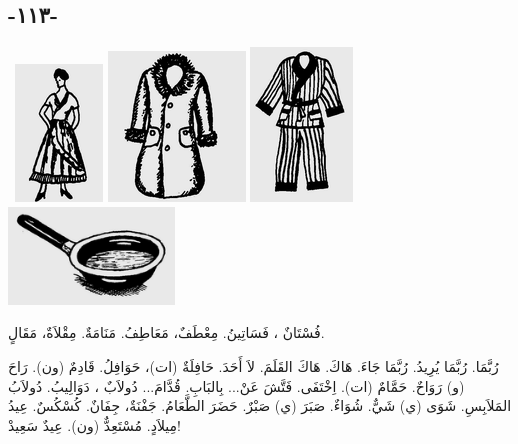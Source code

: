 \documentclass[a5paper]{article}
\begin{document}
\subsection{-١١٣-}
\  \includegraphics[width=0.9165in,height=1.4374in]{MuhammadBagauddinlatinized-img301.png}   \includegraphics[width=1.4374in,height=1.5728in]{MuhammadBagauddinlatinized-img302.png}   \includegraphics[width=1.0728in,height=1.6146in]{MuhammadBagauddinlatinized-img303.png}   \includegraphics[width=1.7398in,height=1.0209in]{MuhammadBagauddinlatinized-img304.png}  

فُسْتَانٌ ، فَسَاتِينُ. مِعْطَفٌ، مَعَاطِفُ. مَنَامَةٌ. مِقْلاَةٌ، مَقَالٍ. 

رُبَّمَا. رُبَّمَا يُرِيدُ. رُبَّمَا جَاءَ. هَاكَ. هَاكَ القَلَمَ. لاَ أَحَدَ. حَافِلَةٌ (ات)، حَوَافِلُ. قَادِمٌ (ون). رَاحَ (و) رَوَاحٌ. حَمَّامٌ (ات). اِخْتَفَى. فَتَّشَ عَنْ... بِالبَابِ. قُدَّامَ... دُولاَبٌ ، دَوَالِيبُ. دُولاَبُ المَلاَبِسِ. شَوَى (ي) شَيٌّ. شُوَاءٌ. صَبَرَ (ي) صَبْرٌ. حَضَرَ الطَّعَامُ. جَفْنَةٌ، جِفَانٌ. كُسْكُسٌ. عِيدُ مِيلاَدٍ. مُسْتَعِدٌّ (ون). عِيدٌ سَعِيدْ!
\end{document}
